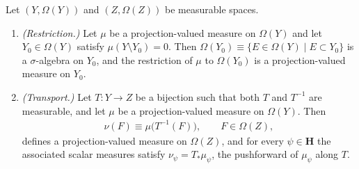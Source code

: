 \begin{lemma}
    \label{lmm:borel-bijection-transports-pvm}
    \leanok
    Let $(Y,\Omega(Y))$ and $(Z,\Omega(Z))$ be measurable spaces.
    \begin{enumerate}
        \item \textit{(Restriction.)} Let $\mu$ be a projection-valued measure on $\Omega(Y)$ and let $Y_0 \in \Omega(Y)$ satisfy $\mu(Y\setminus Y_0) = 0$. Then $\Omega(Y_0) \equiv \{ E \in \Omega(Y) \mid E \subset Y_0 \}$ is a $\sigma$-algebra on $Y_0$, and the restriction of $\mu$ to $\Omega(Y_0)$ is a projection-valued measure on $Y_0$.
        \item \textit{(Transport.)} Let $T : Y \to Z$ be a bijection such that both $T$ and $T^{-1}$ are measurable, and let $\mu$ be a projection-valued measure on $\Omega(Y)$. Then
        \begin{align}
            \nu(F) \equiv \mu\big( T^{-1}(F) \big), \qquad F \in \Omega(Z),
        \end{align}
        defines a projection-valued measure on $\Omega(Z)$, and for every $\psi \in \mathbf{H}$ the associated scalar measures satisfy $\nu_\psi = T_*\mu_\psi$, the pushforward of $\mu_\psi$ along $T$.
    \end{enumerate}
\end{lemma}
